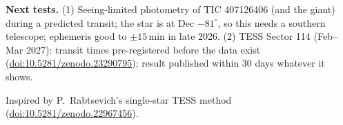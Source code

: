 \documentclass[10pt]{article}
\begin{document}
\textbf{Next tests.} (1) Seeing-limited photometry of TIC 407126406 (and the giant) during a predicted transit; the star is at Dec $-81^\circ$, so this needs a southern telescope; ephemeris good to $\pm15$\,min in late 2026.
(2) TESS Sector 114 (Feb--Mar 2027): transit times pre-registered before the data exist (\href{https://doi.org/10.5281/zenodo.23290795}{doi:10.5281/zenodo.23290795}); result published within 30 days whatever it shows.

\small Inspired by P.~Rabtsevich's single-star TESS method (\href{https://doi.org/10.5281/zenodo.22967456}{doi:10.5281/zenodo.22967456}).
\end{document}
